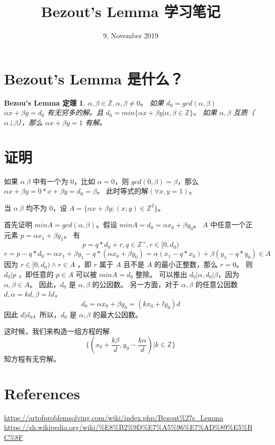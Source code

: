 \documentclass{article}
\title{Bezout's Lemma 学习笔记}
\date{9, November 2019}
\newtheorem{bl}{Bezou's Lemma 定理}
\begin{document}
   \maketitle
   \section{Bezout's Lemma 是什么？}
   \begin{bl}
       $\alpha, \beta \in \mathbb{Z}, \alpha, \beta \ne 0$。
       如果 $d_0 = gcd(\alpha, \beta)$
       $\alpha x + \beta y = d_0$ 有无穷多的解。且 $d_0 = min\{\alpha x + \beta y| \alpha, \beta \in \mathbb{Z}\}$。
       如果 $\alpha, \beta$ 互质（$\alpha \bot \beta$），那么 $\alpha x + \beta y = 1$ 有解。
       
   \end{bl}
   
   \section{证明}
   如果 $\alpha \ \beta$ 中有一个为 0，比如 $\alpha = 0$，则 $gcd(0, \beta) = \beta$，那么 $ \alpha x + \beta y =  0 * x + \beta y = d_0 = \beta$。
   此时等式的解$(\forall x,  y = 1)$。

   当 $\alpha \ \beta$ 均不为 0，设 $A=\{\alpha x + \beta y;(x;y) \in \mathbb{Z}^2\}$。

   首先证明 $minA = gcd(\alpha, \beta)$。假设 $minA = d_0 = \alpha x_0 + \beta y_0 $。
   $A$ 中任意一个正元素 $p=\alpha x_1 + \beta y_1$。
   有 
   $$
   p = q * d_0 + r, q \in \mathbb{Z}^+, r \in [0, d_0)
   $$
   $$
   r = p - q * d_0 = \alpha x_1 + \beta y_1 - q * (\alpha x_0 + \beta y_0) = \alpha (x_1 - q * x_0) + \beta (y_1 - q * y_0) \in A
   $$
   因为 $r \in [0, d_0) \land r \in A$ ，即 $r$ 属于 $A$ 且不是 $A$ 的最小正整数，那么 $r = 0$。
   则 $d_0 | p$ ，即任意的  $p \in A$ 可以被 $minA = d_0$ 整除。
   可以推出 $d_0 | \alpha, d_0 | \beta$，因为 $\alpha, \beta \in A$。
   因此，$ d_0$ 是 $\alpha, \beta $ 的公因数。
   另一方面，对于 $\alpha, \beta $ 的任意公因数$d, \alpha = kd, \beta = ld$，
   $$
   d_0 = \alpha x_0 + \beta y_0 = (k x_0 + l y_0) d
   $$
   因此 $d | d_0$，所以，$d_0$ 是 $\alpha, \beta$ 的最大公因数。

   这时候，我们来构造一组方程的解 
   $$
   \{(x_0 + \frac{k\beta}{d}, y_0 - \frac{k\alpha}{d}) | k \in \mathbb{Z}\}
   $$
   知方程有无穷解。
   \section{References} 
   \url{https://artofproblemsolving.com/wiki/index.php/Bezout\%27s\_Lemma}
   \url{https://zh.wikipedia.org/wiki/%E8%B2%9D%E7%A5%96%E7%AD%89%E5%BC%8F}
\end{document}
